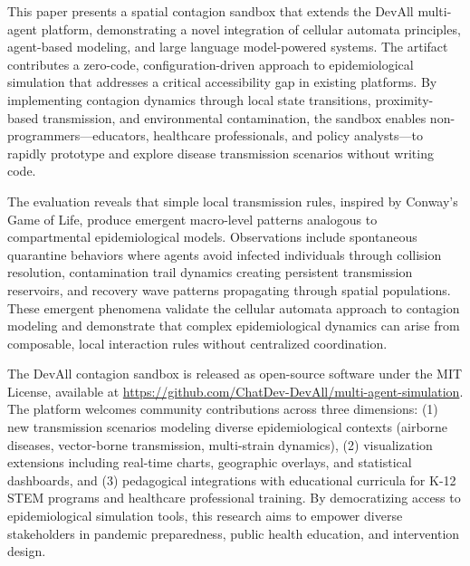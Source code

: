 \label{sec:conclusion}

This paper presents a spatial contagion sandbox that extends the DevAll multi-agent platform, demonstrating a novel integration of cellular automata principles, agent-based modeling, and large language model-powered systems. The artifact contributes a zero-code, configuration-driven approach to epidemiological simulation that addresses a critical accessibility gap in existing platforms. By implementing contagion dynamics through local state transitions, proximity-based transmission, and environmental contamination, the sandbox enables non-programmers---educators, healthcare professionals, and policy analysts---to rapidly prototype and explore disease transmission scenarios without writing code.

The evaluation reveals that simple local transmission rules, inspired by Conway's Game of Life, produce emergent macro-level patterns analogous to compartmental epidemiological models. Observations include spontaneous quarantine behaviors where agents avoid infected individuals through collision resolution, contamination trail dynamics creating persistent transmission reservoirs, and recovery wave patterns propagating through spatial populations. These emergent phenomena validate the cellular automata approach to contagion modeling and demonstrate that complex epidemiological dynamics can arise from composable, local interaction rules without centralized coordination.

The DevAll contagion sandbox is released as open-source software under the MIT License, available at \url{https://github.com/ChatDev-DevAll/multi-agent-simulation}. The platform welcomes community contributions across three dimensions: (1) new transmission scenarios modeling diverse epidemiological contexts (airborne diseases, vector-borne transmission, multi-strain dynamics), (2) visualization extensions including real-time charts, geographic overlays, and statistical dashboards, and (3) pedagogical integrations with educational curricula for K-12 STEM programs and healthcare professional training. By democratizing access to epidemiological simulation tools, this research aims to empower diverse stakeholders in pandemic preparedness, public health education, and intervention design.
